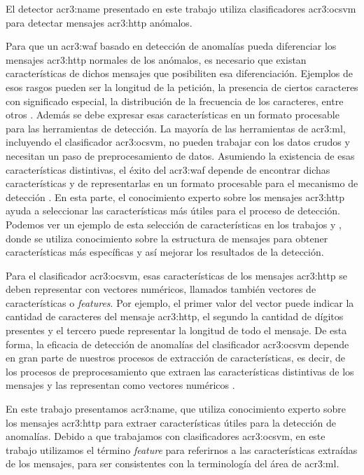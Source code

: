 El detector \gls{acr3:name} presentado en este trabajo utiliza clasificadores
\gls{acr3:ocsvm} para detectar mensajes \gls{acr3:http} anómalos.
\bigskip

Para que un \gls{acr3:waf} basado en detección de anomalías pueda diferenciar
los mensajes \gls{acr3:http} normales de los anómalos, es necesario que
existan características de dichos mensajes que posibiliten esa diferenciación.
Ejemplos de esos rasgos pueden ser la longitud de la petición, la presencia
de ciertos caracteres con significado especial, la distribución de la
frecuencia de los caracteres, entre otros
\citep{kruegel2003anomaly}. %
Además se debe expresar esas características en un formato procesable
para las herramientas de detección. La mayoría de las herramientas de
\gls{acr3:ml}, incluyendo el clasificador \gls{acr3:ocsvm}, no pueden
trabajar con los datos crudos y necesitan un paso de preprocesamiento
de datos.
Asumiendo la existencia de esas características distintivas, el éxito
del \gls{acr3:waf} depende de encontrar dichas características y de
representarlas en un formato procesable para el mecanismo de detección
\citep{torranoGimenez2015study}. %
En esta parte, el conocimiento experto sobre los mensajes \gls{acr3:http}
ayuda a seleccionar las características más útiles para el proceso de
detección. Podemos ver un ejemplo de esta selección de características
en los trabajos \citep{kruegel2003anomaly} y \citep{kruegel2005multi},
donde se utiliza conocimiento sobre la estructura de mensajes para obtener
características más específicas y así mejorar los resultados de la
detección.

Para el clasificador \gls{acr3:ocsvm}, esas características de los mensajes
\gls{acr3:http} se deben representar con vectores numéricos, llamados
también vectores de características o \textit{features}. Por ejemplo,
el primer valor del vector puede indicar la cantidad de caracteres del
mensaje \gls{acr3:http}, el segundo la cantidad de dígitos presentes y
el tercero puede representar la longitud de todo el mensaje.
De esta forma, la eficacia de detección de anomalías del clasificador
\gls{acr3:ocsvm} depende en gran parte de nuestros procesos de extracción
de características, es decir, de los procesos de preprocesamiento que
extraen las características distintivas de los mensajes y las representan
como vectores numéricos
\citep{torranoGimenez2015study}. %

En este trabajo presentamos \gls{acr3:name}, que utiliza conocimiento
experto sobre los mensajes \gls{acr3:http} para extraer características
útiles para la detección de anomalías.
Debido a que trabajamos con clasificadores \gls{acr3:ocsvm}, en este
trabajo utilizamos el término \textit{feature} para referirnos a las
características extraídas de los mensajes, para ser consistentes con
la terminología del área de \gls{acr3:ml}.


